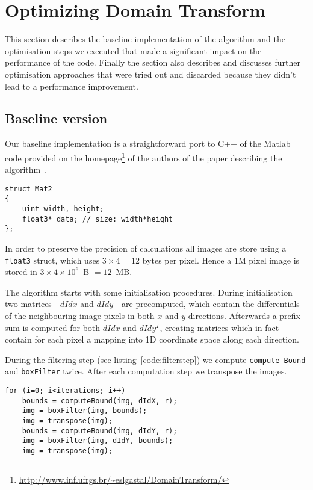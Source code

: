 \section{Optimizing Domain Transform}

This section describes the baseline implementation of the algorithm and the optimisation steps we executed that made a significant impact on the performance of the code. Finally the section also describes and discusses further optimisation approaches that were tried out and discarded because they didn't lead to a performance improvement.

\subsection{Baseline version}

Our baseline implementation is a straightforward port to C++ of the Matlab code provided on the homepage\footnote{\url{http://www.inf.ufrgs.br/~eslgastal/DomainTransform/}} of the authors of the paper describing the algorithm~\cite{GastalOliveira2011DomainTransform}.
\begin{lstlisting}[caption=Matrix struct,label=code:matrix_struct]
struct Mat2
{
    uint width, height;
    float3* data; // size: width*height
};
\end{lstlisting}

In order to preserve the precision of calculations all images are store using a \lstinline{float3} struct, which uses $3\times 4 = 12$ bytes per pixel. Hence a $1$M pixel image is stored in $3\times 4\times 10^6$\ B $=12$\ MB.

The algorithm starts with some initialisation procedures. During initialisation two matrices - $dIdx$ and $dIdy$ - are precomputed, which contain the differentials of the neighbouring image pixels in both $x$ and $y$ directions. Afterwards a prefix sum is computed for both $dIdx$ and $dIdy^T$, creating matrices which in fact contain for each pixel a mapping into 1D coordinate space along each direction.

During the filtering step (see listing~\ref{code:filterstep}) we compute \texttt{comp\-ute\ Bound} and \texttt{boxFilter} twice. After each computation step we transpose the images.

\begin{lstlisting}[caption=Filterstep,label=code:filterstep]
for (i=0; i<iterations; i++)
    bounds = computeBound(img, dIdX, r);
    img = boxFilter(img, bounds);
    img = transpose(img);
    bounds = computeBound(img, dIdY, r);
    img = boxFilter(img, dIdY, bounds);
    img = transpose(img);
\end{lstlisting}

